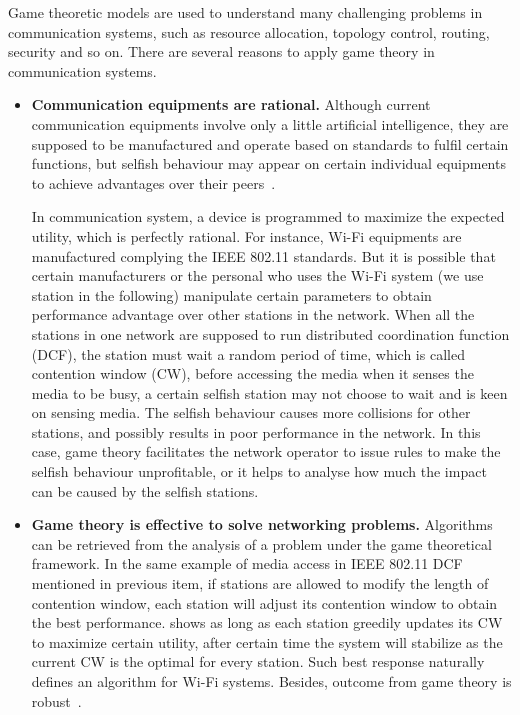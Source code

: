 Game theoretic models are used to understand many challenging problems in communication systems, such as resource allocation, topology control, routing, security and so on. 
There are several reasons to apply game theory in communication systems.
\begin{itemize}
\item \textbf{Communication equipments are rational.}
Although current communication equipments involve only a little artificial intelligence, they are supposed to be manufactured and operate based on standards to fulfil certain functions, but selfish behaviour may appear on certain individual equipments to achieve advantages over their peers~\cite{game_for_communication_01}.

In communication system, a device is programmed to maximize the expected utility, which is perfectly rational.
For instance, Wi-Fi equipments are manufactured complying the IEEE 802.11 standards.
But it is possible that certain manufacturers or the personal who uses the Wi-Fi system (we use station in the following) manipulate certain parameters to obtain performance advantage over other stations in the network.
When all the stations in one network are supposed to run distributed coordination function (\gls{DCF}), \ie the station must wait a random period of time, which is called contention window (\gls{CW}), before accessing the media when it senses the media to be busy, a certain selfish station may not choose to wait and is keen on sensing media.
The selfish behaviour causes more collisions for other stations, and possibly results in poor performance in the network.
In this case, game theory facilitates the network operator to issue rules to make the selfish behaviour unprofitable, or it helps to analyse how much the impact can be caused by the selfish stations.

\item \textbf{Game theory is effective to solve networking problems.}
Algorithms can be retrieved from the analysis of a problem under the game theoretical framework.
In the same example of media access in IEEE 802.11 DCF mentioned in previous item, if stations are allowed to modify the length of contention window, each station will adjust its contention window to obtain the best performance.
\cite{contentiongame_07} shows as long as each station greedily updates its CW to maximize certain utility, after certain time the system will stabilize as the current CW is the optimal for every station.
Such best response naturally defines an algorithm for Wi-Fi systems.
%
Besides, outcome from game theory is robust~\cite{Han:2008:RAW:1457343}.




\end{itemize}
